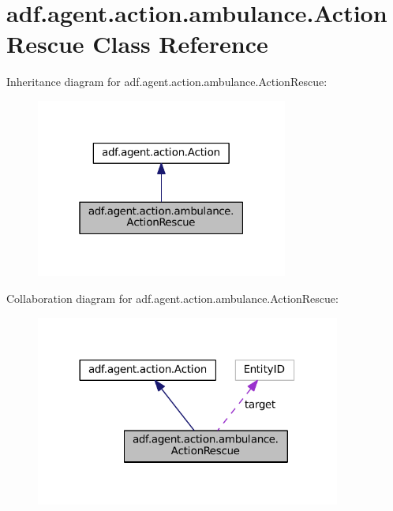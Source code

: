\hypertarget{classadf_1_1agent_1_1action_1_1ambulance_1_1ActionRescue}{}\section{adf.\+agent.\+action.\+ambulance.\+Action\+Rescue Class Reference}
\label{classadf_1_1agent_1_1action_1_1ambulance_1_1ActionRescue}


Inheritance diagram for adf.\+agent.\+action.\+ambulance.\+Action\+Rescue\+:
\nopagebreak
\begin{figure}[H]
\begin{center}
\leavevmode
\includegraphics[width=235pt]{classadf_1_1agent_1_1action_1_1ambulance_1_1ActionRescue__inherit__graph}
\end{center}
\end{figure}


Collaboration diagram for adf.\+agent.\+action.\+ambulance.\+Action\+Rescue\+:
\nopagebreak
\begin{figure}[H]
\begin{center}
\leavevmode
\includegraphics[width=284pt]{classadf_1_1agent_1_1action_1_1ambulance_1_1ActionRescue__coll__graph}
\end{center}
\end{figure}
